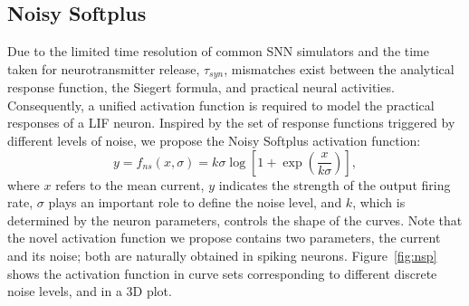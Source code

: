 \documentclass[runningheads,a4paper]{llncs}
\begin{document}



\subsection{Noisy Softplus}
Due to the limited time resolution of common SNN simulators and the time taken for neurotransmitter release, $\tau_{syn}$, mismatches exist between the analytical response function, the Siegert formula, and practical neural activities.
Consequently, a unified activation function is required to model the practical responses of a LIF neuron.
Inspired by the set of response functions triggered by different levels of noise, we propose the Noisy Softplus activation function:
\begin{equation}
y = f_{ns}(x, \sigma) = k \sigma \log [1 + \exp(\frac{x}{k \sigma})],
\label{equ:nsp}
\end{equation}
where $x$ refers to the mean current, $y$ indicates the strength of the output firing rate, $\sigma$ plays an important role to define the noise level, and $k$, which is determined by the neuron parameters, controls the shape of the curves.
Note that the novel activation function we propose contains two parameters, the current and its noise; both are naturally obtained in spiking neurons.
Figure~\ref{fig:nsp} shows the activation function in curve sets corresponding to different discrete noise levels, and in a 3D plot.
\end{document}
